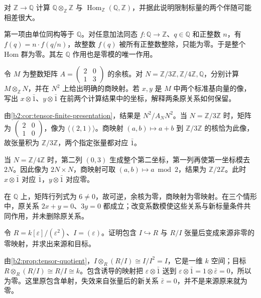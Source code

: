 \begin{exercise}\label{b2:ex:06-coinduction-rational}
	对 \(\mathbb Z\to\mathbb Q\) 计算 \(\mathbb Q\otimes_{\mathbb Z}\mathbb Z\) 与 \(\operatorname{Hom}_{\mathbb Z}(\mathbb Q,\mathbb Z)\)，并据此说明限制标量的两个伴随可能相差很大。
\end{exercise}
\begin{solution}
	第一项由单位同构等于 \(\mathbb Q\)。对任意加法同态 \(f:\mathbb Q\to\mathbb Z\)、\(q\in\mathbb Q\) 和正整数 \(n\)，有 \(f(q)=n\cdot f(q/n)\)，故整数 \(f(q)\) 被所有正整数整除，只能为零。于是整个 Hom 群为零。其左 \(\mathbb Q\) 作用也是零模的唯一作用。
\end{solution}

\begin{exercise}\label{b2:ex:06-tensor-presentation}
	令 \(M\) 为整数矩阵 \(A=\begin{pmatrix}2&0\\1&3\end{pmatrix}\) 的余核。对 \(N=\mathbb Z/3\mathbb Z,\mathbb Z/4\mathbb Z,\mathbb Q\)，分别计算 \(M\otimes_{\mathbb Z}N\)，并在 \(N^2\) 上给出明确的商映射。若 \(x,y\) 是 \(M\) 中两个标准基向量的像，写出 \(x\otimes\bar1\)、\(y\otimes\bar1\) 在前两个计算结果中的坐标，解释两条原关系如何保留。
\end{exercise}
\begin{solution}
	由\cref{b2:cor:tensor-finite-presentation}，结果是 \(N^2/A_NN^2\)。当 \(N=\mathbb Z/3\mathbb Z\) 时，矩阵为 \(\begin{pmatrix}2&0\\1&0\end{pmatrix}\)，像为 \(\langle(2,1)\rangle\)。商映射 \((a,b)\mapsto a+b\) 到 \(\mathbb Z/3\mathbb Z\) 的核恰为此像，故张量积为 \(\mathbb Z/3\mathbb Z\)，两个指定张量都对应 \(\bar1\)。

	当 \(N=\mathbb Z/4\mathbb Z\) 时，第二列 \((0,3)\) 生成整个第二坐标，第一列再使第一坐标模去 \(2N\)。因此像为 \(2N\times N\)，商映射可取 \((a,b)\mapsto a\bmod2\)，结果为 \(\mathbb Z/2\mathbb Z\)。此时 \(x\otimes\bar1\) 对应 \(\bar1\)，\(y\otimes\bar1\) 对应零。

	在 \(\mathbb Q\) 上，矩阵行列式为 \(6\ne0\)，故可逆，余核为零，商映射为零映射。在三个情形中，原关系 \(2x+y=0\)、\(3y=0\) 都成立；改变系数模使这些关系与新标量条件共同作用，并未删除原关系。
\end{solution}

\begin{exercise}\label{b2:ex:06-dual-number-kernel}
	令 \(R=k[\varepsilon]/(\varepsilon^2)\)、\(I=(\varepsilon)\)。证明包含 \(I\hookrightarrow R\) 与 \(R/I\) 张量后变成来源非零的零映射，并求出来源和目标。
\end{exercise}
\begin{solution}
	由\cref{b2:prop:tensor-quotient}，\(I\otimes_R(R/I)\cong I/I^2=I\)，它是一维 \(k\) 空间；目标 \(R\otimes_R(R/I)\cong R/I\cong k\)。包含诱导的映射把 \(\varepsilon\otimes\bar1\) 送到 \(\varepsilon\otimes\bar1=1\otimes\bar\varepsilon=0\)，所以为零。这里原包含单射，失效来自张量后的新关系 \(\bar\varepsilon=0\)，并不是来源原来就为零。
\end{solution}

